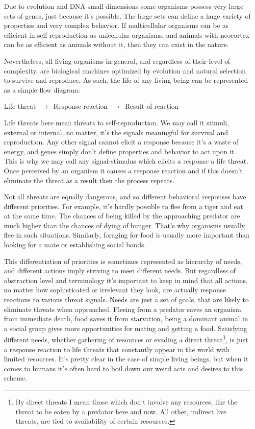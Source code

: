 \documentclass[12pt]{report}
\begin{document}
\noindent Due to evolution and DNA small dimensions some organisms possess very large sets of genes, just because it’s possible. The large sets can define a huge variety of properties and very complex behavior. If multicellular organisms can be as efficient in self-reproduction as unicellular organisms, and animals with neocortex can be as efficient as animals without it, then they can exist in the nature.

\noindent Nevertheless, all living organisms in general, and regardless of their level of complexity, are biological machines optimized by evolution and natural selection to survive and reproduce. As such, the life of any living being can be represented as a simple flow diagram:

\begin{center}
Life threat $\,\to\,$ Response reaction $\,\to\,$ Result of reaction
\end{center}

\noindent Life threats here mean threats to self-reproduction. We may call it stimuli, external or internal, no matter, it’s the signals meaningful for survival and reproduction. Any other signal cannot elicit a response because it’s a waste of energy, and genes simply don’t define properties and behavior to act upon it. This is why we may call any signal-stimulus which elicits a response a life threat. Once perceived by an organism it causes a response reaction and if this doesn’t eliminate the threat as a result then the process repeats.

\noindent Not all threats are equally dangerous, and so different behavioral responses have different priorities. For example, it’s hardly possible to flee from a tiger and eat at the same time. The chances of being killed by the approaching predator are much higher than the chances of dying of hunger. That’s why organisms usually flee in such situations. Similarly, foraging for food is usually more important than looking for a mate or establishing social bonds.

\noindent This differentiation of priorities is sometimes represented as hierarchy of needs, and different actions imply striving to meet different needs. But regardless of abstraction level and terminology it’s important to keep in mind that all actions, no matter how sophisticated or irrelevant they look, are actually response reactions to various threat signals. Needs are just a set of goals, that are likely to eliminate threats when approached. Fleeing from a predator saves an organism from immediate death, food saves it from starvation, being a dominant animal in a social group gives more opportunities for mating and getting a food. Satisfying different needs, whether gathering of resources or evading a direct threat\footnote{By direct threats I mean those which don’t involve any resources, like the threat to be eaten by a predator here and now. All other, indirect live threats, are tied to availability of certain resources.}, is just a response reaction to life threats that constantly appear in the world with limited resources. It’s pretty clear in the case of simple living beings, but when it comes to humans it’s often hard to boil down our weird acts and desires to this scheme.
\end{document}
